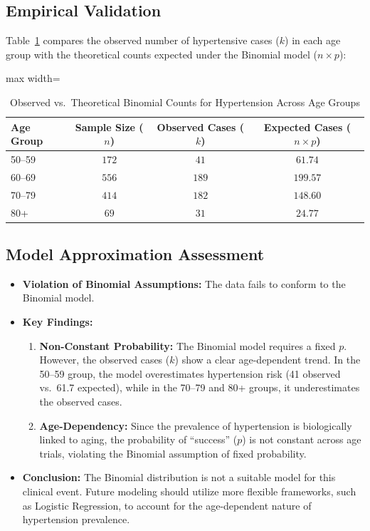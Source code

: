 \documentclass[11pt, a4paper]{article}
\begin{document}
\subsection{Empirical Validation}
Table~\ref{tab:task5_binomial} compares the observed number of hypertensive cases ($k$) in each age group with the theoretical counts expected under the Binomial model ($n \times p$):

\begin{table}[H]
\centering
\caption{Observed vs.\ Theoretical Binomial Counts for Hypertension Across Age Groups}
\label{tab:task5_binomial}
\begin{adjustbox}{max width=\textwidth}
\small
\begin{tabular}{lccc}
\toprule
\textbf{Age Group} & \textbf{Sample Size ($n$)} & \textbf{Observed Cases ($k$)} & \textbf{Expected Cases ($n \times p$)} \\
\midrule
50--59 & $172$ & $41$ & $61.74$ \\
60--69 & $556$ & $189$ & $199.57$ \\
70--79 & $414$ & $182$ & $148.60$ \\
80+    & $69$  & $31$  & $24.77$  \\
\bottomrule
\end{tabular}
\end{adjustbox}
\end{table}

\subsection{Model Approximation Assessment}
\begin{itemize}
    \item \textbf{Violation of Binomial Assumptions:} The data fails to conform to the Binomial model.
    \item \textbf{Key Findings:}
    \begin{enumerate}
        \item \textbf{Non-Constant Probability:} The Binomial model requires a fixed $p$. However, the observed cases ($k$) show a clear age-dependent trend. In the 50--59 group, the model overestimates hypertension risk (41 observed vs.\ 61.7 expected), while in the 70--79 and 80+ groups, it underestimates the observed cases.
        \item \textbf{Age-Dependency:} Since the prevalence of hypertension is biologically linked to aging, the probability of ``success'' ($p$) is not constant across age trials, violating the Binomial assumption of fixed probability.
    \end{enumerate}
    \item \textbf{Conclusion:} The Binomial distribution is not a suitable model for this clinical event. Future modeling should utilize more flexible frameworks, such as Logistic Regression, to account for the age-dependent nature of hypertension prevalence.
\end{itemize}
\end{document}
